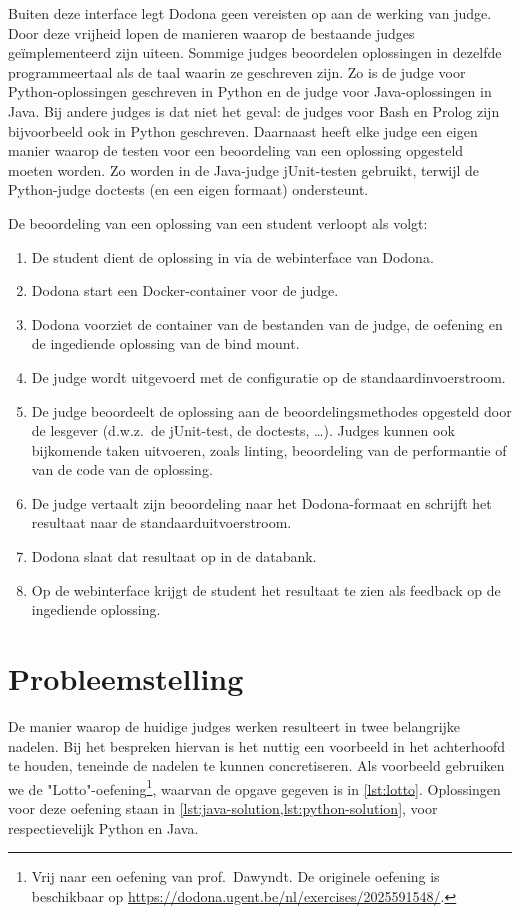 Buiten deze interface legt Dodona geen vereisten op aan de werking van judge.
Door deze vrijheid lopen de manieren waarop de bestaande judges geïmplementeerd zijn uiteen.
Sommige judges beoordelen oplossingen in dezelfde programmeertaal als de taal waarin ze geschreven zijn.
Zo is de judge voor Python-oplossingen geschreven in Python en de judge voor Java-oplossingen in Java.
Bij andere judges is dat niet het geval: de judges voor Bash en Prolog zijn bijvoorbeeld ook in Python geschreven.
Daarnaast heeft elke judge een eigen manier waarop de testen voor een beoordeling van een oplossing opgesteld moeten worden.
Zo worden in de Java-judge jUnit-testen gebruikt, terwijl de Python-judge doctests (en een eigen formaat) ondersteunt.

De beoordeling van een oplossing van een student verloopt als volgt:

\begin{enumerate}
    \item De student dient de oplossing in via de webinterface van Dodona.
    \item Dodona start een Docker-container voor de judge.
    \item Dodona voorziet de container van de bestanden van de judge, de oefening en de ingediende oplossing van de bind mount.
    \item De judge wordt uitgevoerd met de configuratie op de standaardinvoerstroom.
    \item De judge beoordeelt de oplossing aan de beoordelingsmethodes opgesteld door de lesgever (d.w.z.\ de jUnit-test, de doctests, \ldots).
    Judges kunnen ook bijkomende taken uitvoeren, zoals linting, beoordeling van de performantie of  van de code van de oplossing.
    \item De judge vertaalt zijn beoordeling naar het Dodona-formaat en schrijft het resultaat naar de standaarduitvoerstroom.
    \item Dodona slaat dat resultaat op in de databank.
    \item Op de webinterface krijgt de student het resultaat te zien als feedback op de ingediende oplossing.
\end{enumerate}

\section{Probleemstelling}\label{sec:probleemstelling}

De manier waarop de huidige judges werken resulteert in twee belangrijke nadelen.
Bij het bespreken hiervan is het nuttig een voorbeeld in het achterhoofd te houden, teneinde de nadelen te kunnen concretiseren.
Als voorbeeld gebruiken we de "Lotto"-oefening\footnote{Vrij naar een oefening van prof.\ Dawyndt.
De originele oefening is beschikbaar op \url{https://dodona.ugent.be/nl/exercises/2025591548/}.}, waarvan de opgave gegeven is in \cref{lst:lotto}.
Oplossingen voor deze oefening staan in \cref{lst:java-solution,lst:python-solution}, voor respectievelijk Python en Java.

